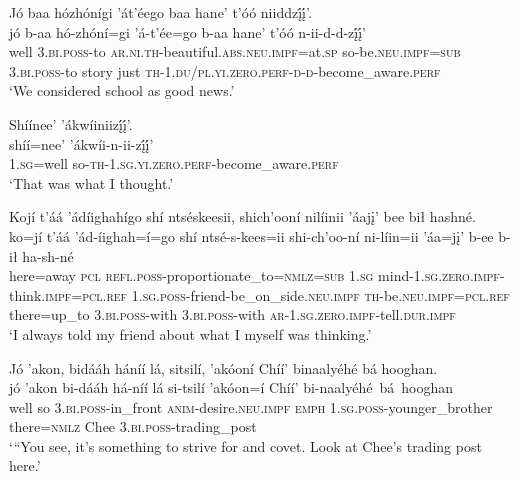 \ea\label{ex:text1-30-12}
Jó baa hózhónígi ’át’éego baa hane’ t’óó niiddzį́į́’.\\
\gll jó	b-aa	hó-zhóní=gi	’á-t’ée=go	b-aa	hane’	t’óó	n-ii-d-d-zį́į́’\\
     well	3.\textsc{bi}.\textsc{poss}-to	\textsc{ar}.\textsc{ni}.\textsc{th}-beautiful.\textsc{abs}.\textsc{neu}.\textsc{impf}=at.\textsc{sp}	so-be.\textsc{neu}.\textsc{impf}=\textsc{sub}	3.\textsc{bi}.\textsc{poss}-to	story	just	\textsc{th}-1.\textsc{du}/\textsc{pl}.\textsc{yi}.\textsc{zero}.\textsc{perf}-\textsc{d}-\textsc{d}-become\_aware.\textsc{perf}\\
\glt `We considered school as good news.'
\z

\ea\label{ex:text1-30-13}
Shíínee’ ’ákwíiniizį́į́’.\\
\gll shíí=nee’	’ákwíi-n-ii-zį́į́’\\
     1.\textsc{sg}=well	so-\textsc{th}-1.\textsc{sg}.\textsc{yi}.\textsc{zero}.\textsc{perf}-become\_aware.\textsc{perf}\\
\glt `That was what I thought.'
\z

\ea\label{ex:text1-30-14}
Kojí t’áá ’ádíighahígo shí ntséskeesii, shich’ooní nilíinii ’áajį’ bee bił hashné.\\
\gll ko=jí	t’áá ’ád-íighah=í=go	shí	ntsé-s-kees=ii	shi-ch’oo-ní	ni-líin=ii	’áa=jį’	b-ee	b-ił	ha-sh-né\\
     here=away	\textsc{pcl} \textsc{refl}.\textsc{poss}-proportionate\_to=\textsc{nmlz}=\textsc{sub}	1.\textsc{sg}	mind-1.\textsc{sg}.\textsc{zero}.\textsc{impf}-think.\textsc{impf}=\textsc{pcl}.\textsc{ref}	1.\textsc{sg}.\textsc{poss}-friend-be\_on\_side.\textsc{neu}.\textsc{impf}	\textsc{th}-be.\textsc{neu}.\textsc{impf}=\textsc{pcl}.\textsc{ref}	there=up\_to	3.\textsc{bi}.\textsc{poss}-with	3.\textsc{bi}.\textsc{poss}-with	\textsc{ar}-1.\textsc{sg}.\textsc{zero}.\textsc{impf}-tell.\textsc{dur}.\textsc{impf}\\
\glt `I always told my friend about what I myself was thinking.'
\z

\ea\label{ex:text1-30-15}
Jó ’akon, bidááh háníí lá, sitsilí, ’akóoní Chíí’ binaalyéhé bá hooghan.\\
\gll jó	’akon	bi-dááh	há-níí	lá	si-tsilí	’akóon=í	Chíí’	bi-naalyéhé~bá~{hooghan}\\
     well	so	3.\textsc{bi}.\textsc{poss}-in\_front	\textsc{anim}-desire.\textsc{neu}.\textsc{impf}	\textsc{emph}	1.\textsc{sg}.\textsc{poss}-younger\_brother	there=\textsc{nmlz}	Chee	3.\textsc{bi}.\textsc{poss}-trading\_post\\
\glt `{``}You see, it's something to strive for and covet. Look at Chee's trading post here.'
\z

